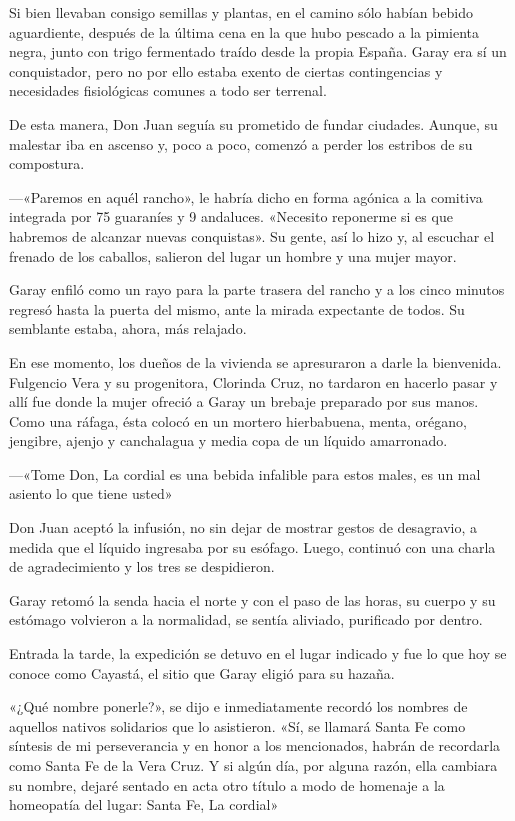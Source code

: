 \documentclass[11pt,twoside,openright,a5paper]{book}
\begin{document}
Si bien llevaban consigo semillas y plantas, en el camino sólo habían bebido aguardiente, después de la última cena en la que hubo pescado a la pimienta negra, junto con trigo fermentado traído desde la propia España. Garay era sí un conquistador, pero no por ello estaba exento de ciertas contingencias y necesidades fisiológicas comunes a todo ser terrenal.

De esta manera, Don Juan seguía su prometido de fundar ciudades. Aunque, su malestar iba en ascenso y, poco a poco, comenzó a perder los estribos de su compostura. 

---«Paremos en aquél rancho», le habría dicho en forma agónica a la comitiva integrada por 75 guaraníes y 9 andaluces. «Necesito reponerme si es que habremos de alcanzar nuevas conquistas». Su gente, así lo hizo y, al escuchar el frenado de los caballos, salieron del lugar un hombre y una mujer mayor.

Garay enfiló como un rayo para la parte trasera del rancho y a los cinco minutos regresó hasta la puerta del mismo, ante la mirada expectante de todos. Su semblante estaba, ahora, más relajado.

En ese momento, los dueños de la vivienda se apresuraron a darle la bienvenida. Fulgencio Vera y su progenitora, Clorinda Cruz, no tardaron en hacerlo pasar y allí fue donde la mujer ofreció a Garay un brebaje preparado por sus manos. Como una ráfaga, ésta colocó en un mortero hierbabuena, menta, orégano, jengibre, ajenjo y canchalagua y media copa de un líquido amarronado. 

---«Tome Don, La cordial es una bebida infalible para estos males, es un mal asiento lo que tiene usted»

Don Juan aceptó la infusión, no sin dejar de mostrar gestos de desagravio, a medida que el líquido ingresaba por su esófago. Luego, continuó con una charla de agradecimiento y los tres se despidieron. 

Garay retomó la senda hacia el norte y con el paso de las horas, su cuerpo y su estómago volvieron a la normalidad, se sentía aliviado, purificado por dentro.

Entrada la tarde, la expedición se detuvo en el lugar indicado y fue lo que hoy se conoce como Cayastá, el sitio que Garay eligió para su hazaña.

«¿Qué nombre ponerle?», se dijo e inmediatamente recordó los nombres de aquellos nativos solidarios que lo asistieron. «Sí, se llamará Santa Fe como síntesis de mi perseverancia y en honor a los mencionados, habrán de recordarla como Santa Fe de la Vera Cruz. Y si algún día, por alguna razón, ella cambiara su nombre, dejaré sentado en acta otro título a modo de homenaje a la homeopatía del lugar: Santa Fe, La cordial»
\end{document}
